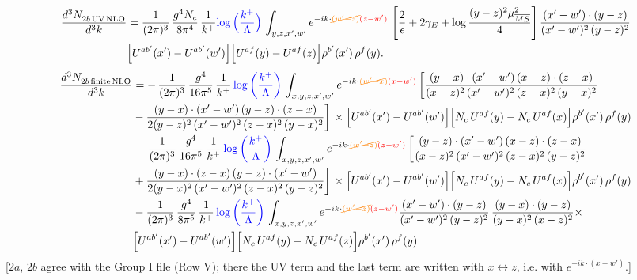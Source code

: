 \documentclass[9pt]{article}
\numberwithin{equation}{section}
\begin{document}
\begin{align}
\frac{d^{3}N_{2b\,\rm UV\, NLO}^{\rm}}{d^{3}k} & = \frac{1}{(2\pi)^{3}}\,\frac{g^{4}N_{c}}{8\pi^{4}}\,\frac{1}{k^{+}}
{\color{blue}\log\Big(\frac{k^{+}}{\Lambda}\Big)}\,\int_{y,z,x',w'}e^{-ik\cdot{\color{orange}\cancel{(w'-z)}}{\color{red}(z-w')}}\, \left[\frac{2}{\epsilon}+2\gamma_{E}+\log\frac{(y-z)^{2}\mu^{2}_{\overline{MS}}}{4}\right]
\frac{(x'-w')\cdot(y-z)}{(x'-w')^{2}\,(y-z)^{2}}\notag \\ &  \Big[U^{ab'}(x')-U^{ab'}(w')\Big]\Big[U^{af}(y)-U^{af}(z)\Big]\rho^{b'}(x')\,\rho^{f}(y).
\end{align}
\begin{align}
    \frac{d^{3}N_{2b\,\rm finite\, NLO}^{\rm}}{d^{3}k} & =  -\, \frac{1}{(2\pi)^{3}}\,\frac{g^{4}}{16\pi^{5}}\,\frac{1}{k^{+}}\,{\color{blue}\log{\left(\frac{k^{+}}{\Lambda}\right)}}\,\int_{x,y,z,x',w'}e^{-ik\cdot{\color{orange}\cancel{(w'-x)}}{\color{red}(x-w')}}\, \bigg[\frac{(y-x)\cdot (x'-w')\,(x-z)\cdot (z-x)}{(x-z)^{2}\,(x'-w')^{2}\,(z-x)^{2}\,(y-x)^{2}}\notag \\ & -\frac{(y-x)\cdot (x'-w')\,(y-z)\cdot (z-x)}{2(y-z)^{2}\,(x'-w')^{2}\,(z-x)^{2}\,(y-x)^{2}}\bigg]\,\times \Big[U^{ab'}(x')-U^{ab'}(w')\Big]\Big[N_{c}\,U^{af}(y)-N_{c}\,U^{af}(x)\Big]\rho^{b'}(x')\,\rho^{f}(y)\notag \\ & -\, \frac{1}{(2\pi)^{3}}\,\frac{g^{4}}{16\pi^{5}}\,\frac{1}{k^{+}}\,{\color{blue}\log{\left(\frac{k^{+}}{\Lambda}\right)}}\,\int_{x,y,z,x',w'}e^{-ik\cdot{\color{orange}\cancel{(w'-z)}}{\color{red}(z-w')}}\,\bigg[\frac{(y-z)\cdot (x'-w')\,(x-z)\cdot (z-x)}{(x-z)^{2}\,(x'-w')^{2}\,(z-x)^{2}\,(y-z)^{2}}\notag \\ & +\frac{(y-x)\cdot (z-x)\,(y-z)\cdot (x'-w')}{2(y-x)^{2}\,(x'-w')^{2}\,(z-x)^{2}\,(y-z)^{2}}\bigg]\,\times \Big[U^{ab'}(x')-U^{ab'}(w')\Big]\Big[N_{c}\,U^{af}(y)-N_{c}\,U^{af}(x)\Big]\rho^{b'}(x')\,\rho^{f}(y)\notag \\ & - \frac{1}{(2\pi)^{3}}\,\frac{g^{4}}{8\pi^{5}}\,\frac{1}{k^{+}}\,{\color{blue}\log{\left(\frac{k^{+}}{\Lambda}\right)}}\,\int_{x,y,z,x',w'}e^{-ik\cdot{\color{orange}\cancel{(w'-z)}}{\color{red}(z-w')}} \frac{(x'-w')\cdot(y-z)}{(x'-w')^{2}\,(y-z)^{2}}\,\frac{(y-x)\cdot(y-z)}{(y-x)^{2}\,(x-z)^{2}}\times\notag \\ & \Big[U^{ab'}(x')-U^{ab'}(w')\Big]\Big[N_{c}\,U^{af}(y)-N_{c}\,U^{af}(z)\Big]\rho^{b'}(x')\,\rho^{f}(y)
\end{align} {\color{red}[$2a$, $2b$ agree with the Group I file (Row V); there the UV term and the last term are written with $x\leftrightarrow z$, i.e. with $e^{-ik\cdot(x-w')}$.]}\par\noindent
\end{document}
